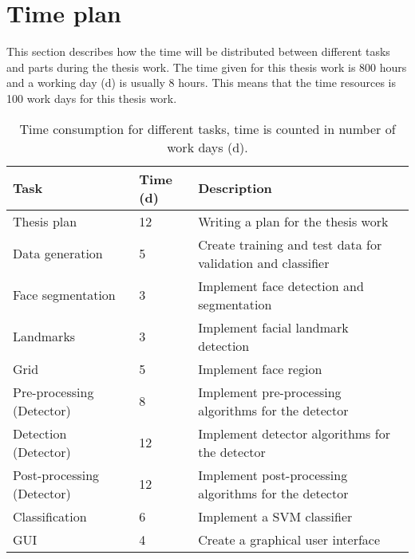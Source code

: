 \section{Time plan}

This section describes how the time will be distributed between different tasks and parts during the thesis work. The time given for this thesis work is 800 hours and a working day (d) is usually 8 hours. This means that the  time resources is 100 work days for this thesis work.   

\begin{table}[H]
	\caption{Time consumption for different tasks, time is counted in number of work days (d).}
	\label{table:time_consumption}
	\begin{tabular}{|p{}|p{}|p{}|}
		\hline
		\textbf{Task}              & \textbf{Time (d)} & \textbf{Description}                                        \\ \hline
		Thesis plan                & 12                & Writing a plan for the thesis work                          \\ \hline
		Data generation            & 5                 & Create training and test data for validation and classifier \\ \hline
		Face segmentation          & 3                 & Implement face detection and segmentation                   \\ \hline
		Landmarks                  & 3                 & Implement facial landmark detection                         \\ \hline
		Grid                       & 5                 & Implement face region                                       \\ \hline
		Pre-processing (Detector)  & 8                 & Implement pre-processing algorithms for the detector        \\ \hline
		Detection (Detector)       & 12                & Implement detector algorithms for the detector              \\ \hline
		Post-processing (Detector) & 12                & Implement post-processing algorithms for the detector       \\ \hline
		Classification             & 6                 & Implement a SVM classifier                                  \\ \hline
		GUI                        & 4                 & Create a graphical user interface                           \\ \hline

\end{tabular}
\end{table}
